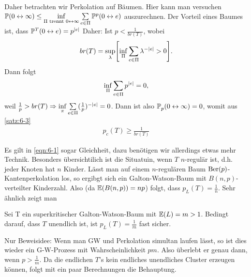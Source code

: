 Daher betrachten wir Perkolation auf Bäumen. Hier kann man versuchen $\propE{0 \leftrightarrow \infty} \leq \inf\limits_{\Pi \text{ trennt }0 \leftrightarrow \infty}\sum\limits_{e \in \Pi} \propE{0 \leftrightarrow e}[p]$ auszurechnen. 
Der Vorteil eines Baumes ist, dass $\prop{0 \leftrightarrow e}[T] = p^{\abs{e}}$
Daher: Ist $p < \frac{1}{br(T)}$, wobei 
\begin{align} 
	br(T) = \sup\limits_{\lambda}\benb{\inf\limits_{\Pi} \sum\limits_{e \in \Pi} \lambda^{-\abs{e}} > 0 }. 
\end{align}
Dann folgt
\begin{align}
	\inf\limits_{\Pi} \sum\limits_{e \in \Pi} p^{\lvert e\rvert} = 0,
\end{align}
weil $\frac{1}{p} > br(T) \Rightarrow \inf\limits_{\pi} \sum\limits_{e \in \Pi} (\frac{1}{p})^{-\lvert e\rvert} = 0$. Dann ist also $\prop{0 \leftrightarrow \infty}[][p] = 0$, womit aus \autoref{satz:6-3} 
\begin{align}
	p_c(T) \geq \frac{1}{br(T)} \label{eqn:6-1}
\end{align}

Es gilt in \eqref{eqn:6-1} sogar Gleichheit, dazu benötigen wir allerdings etwas mehr Technik. Besonders übersichtilich ist die Situatuin, wenn $T$ $n$-regulär ist, d.h. jeder Knoten hat $n$ Kinder. Lässt man auf einem $n$-regulären Baum $\operatorname{Ber}(p)$-Kantenperkolation los, so ergibgt sich ein Galton-Watson-Baum mit $B(n,p)$-verteilter Kinderzahl. Also (da $\EW{B(n,p)} = np$) folgt, dass $p_L (T) = \frac{1}{n}$. Sehr ähnlich zeigt man
\begin{satz}[Lyons '90]
	\label{satz:6-4}
	Sei T ein superkritischer Galton-Watson-Baum mit $\EW{L} = m > 1$. Bedingt darauf, dass $T$ unendlich ist, ist $p_L(T) = \frac{1}{m}$ fast sicher. 
\end{satz}
\begin{beweis} Nur Beweisidee: Wenn man GW und Perkolation simultan laufen lässt, so ist dies wieder ein G-W-Prozess mit Wahrscheinlichkeit $pm$. Also überlebt er genau dann, wenn $p > \frac{1}{m}$. Da die endlichen $T$'s kein endliches unendliches Cluster erzeugen können, folgt mit ein paar Berechnungen die Behauptung. 
\end{beweis}


